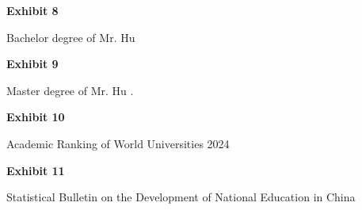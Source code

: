\documentclass{article}
\begin{document}
% 




\vspace*{\fill}
\begin{center}

{\LARGE \bf
Exhibit 8
}

\vspace{10\baselineskip}

{\large Bachelor degree of Mr. Hu}

\end{center}
\vspace*{\fill}


% 


\vspace*{\fill}
\begin{center}

{\LARGE \bf
Exhibit 9
}

\vspace{10\baselineskip}

{\large Master degree of Mr. Hu .}

\end{center}
\vspace*{\fill}

% 




\vspace*{\fill}
\begin{center}

{\LARGE \bf
Exhibit 10
}

\vspace{10\baselineskip}

{\large Academic Ranking of World Universities 2024}

\end{center}
\vspace*{\fill}

 

\vspace*{\fill}
\begin{center}

{\LARGE \bf
Exhibit 11
}

\vspace{10\baselineskip}

{\large Statistical Bulletin on the Development of National Education in China}

\end{center}
\vspace*{\fill}
\end{document}
